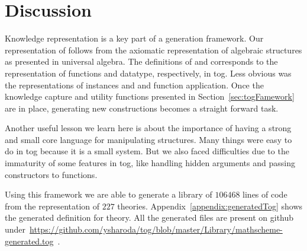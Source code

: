 

\section{Discussion}
\label{sec:generation:discussion}

Knowledge representation is a key part of a generation framework. Our representation of  follows from the axiomatic representation of algebraic structures as presented in universal algebra. The definitions of  and  corresponds to the representation of functions and datatype, respectively, in tog. Less obvious was the representations of instances  and  and function application. 
Once the knowledge capture and utility functions presented in Section~\ref{sec:togFamework} are in place, generating new constructions becomes a straight forward task. 

Another useful lesson we learn here is about the importance of having a strong and small core language for manipulating structures. Many things were easy to do in tog because it is a small system. But we also faced difficulties due to the immaturity of some features in tog, like handling hidden arguments and passing constructors to functions. 

Using this framework we are able to generate a library of $106468$ lines of code from the representation of $227$ theories. Appendix~\ref{appendix:generatedTog} shows the generated definition for  theory. All the generated files are present on github under~\url{https://github.com/ysharoda/tog/blob/master/Library/mathscheme-generated.tog}~. 
 
